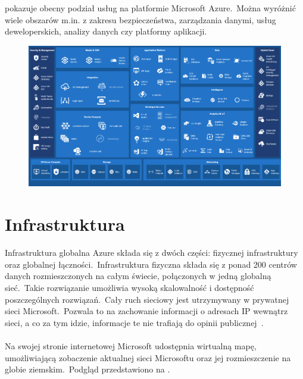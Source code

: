 \vfill
\pagebreak

 pokazuje obecny podział usług na platformie Microsoft Azure.\ Można wyróżnić wiele obszarów m.in. z zakresu bezpieczeństwa, zarządzania danymi, usług deweloperskich, analizy danych czy platformy aplikacji.

\begin{figure}[H]
    \includegraphics[width=\textwidth]{images/ms_azure}
    \label{fig:ms-azure}
\end{figure}

\section{Infrastruktura}
Infrastruktura globalna Azure składa się z dwóch części: fizycznej infrastruktury oraz globalnej łączności.\ Infrastruktura fizyczna składa się z ponad 200 centrów danych rozmieszczonych na całym świecie, połączonych w jedną globalną sieć.\ Takie rozwiązanie umożliwia wysoką skalowalność i dostępność poszczególnych rozwiązań.\ Cały ruch sieciowy jest utrzymywany w prywatnej sieci Microsoft.\ Pozwala to na zachowanie informacji o adresach IP wewnątrz sieci, a co za tym idzie, informacje te nie trafiają do opinii publicznej~\cite{MicrosoftAzureb}.\\ \\

Na swojej stronie internetowej Microsoft udostępnia wirtualną mapę, umożliwiającą zobaczenie aktualnej sieci Microsoftu oraz jej rozmieszczenie na globie ziemskim.\ Podgląd przedstawiono na .

